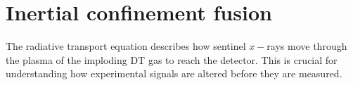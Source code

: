 \section{\label{sec:inertial confinement fusion}Inertial confinement fusion}

The radiative transport equation describes how sentinel $x-$rays move through the plasma of the imploding DT gas to reach the detector. This is crucial for understanding how experimental signals are altered before they are measured.

%
%

\endinput %